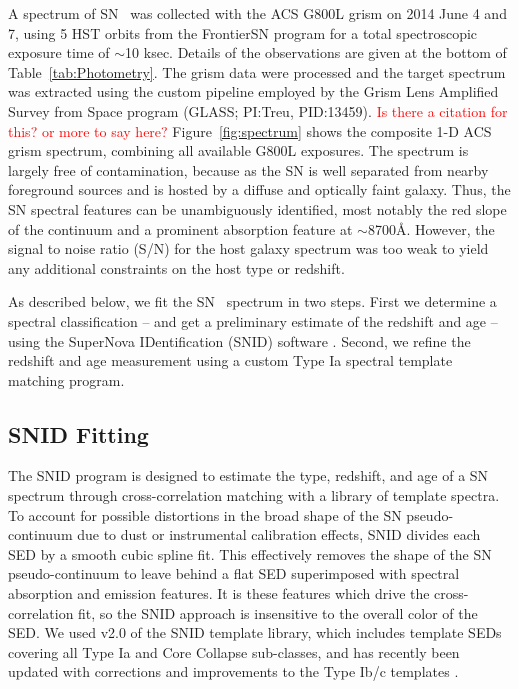 A spectrum of SN \tomas\ was collected with the ACS G800L grism on
2014 June 4 and 7, using 5 HST orbits from the FrontierSN program for
a total spectroscopic exposure time of $\sim$10 ksec.  Details of the
observations are given at the bottom of
Table~\ref{tab:Photometry}. The grism data were processed and the
target spectrum was extracted using the custom pipeline employed by
the Grism Lens Amplified Survey from Space program (GLASS; PI:Treu,
PID:13459). \textcolor{red}{Is there a citation for this? or more to
say here?}  Figure~\ref{fig:spectrum} shows the composite 1-D ACS
grism spectrum, combining all available G800L exposures.  The spectrum
is largely free of contamination, because as the SN is well separated
from nearby foreground sources and is hosted by a diffuse and
optically faint galaxy.  Thus, the SN spectral features can be
unambiguously identified, most notably the red slope of the continuum
and a prominent absorption feature at $\sim$8700\AA.  However, the
signal to noise ratio (S/N) for the host galaxy spectrum was too weak
to yield any additional constraints on the host type or redshift.  

As described below, we fit the SN \tomas\ spectrum in two steps.
First we determine a spectral classification -- and get a preliminary
estimate of the redshift and age -- using the SuperNova IDentification
(SNID) software \citep{Blondin:2007}.  Second, we refine the redshift
and age measurement using a custom Type Ia spectral template matching
program.

\subsection{SNID Fitting}
\label{sec:SNID}

The SNID program is designed to estimate the type, redshift, and age
of a SN spectrum through cross-correlation matching with a library of
template spectra.  To account for possible distortions in the broad
shape of the SN pseudo-continuum due to dust or instrumental
calibration effects, SNID divides each SED by a smooth cubic spline
fit. This effectively removes the shape of the SN pseudo-continuum to
leave behind a flat SED superimposed with spectral absorption and
emission features.  It is these features which drive the
cross-correlation fit, so the SNID approach is insensitive to the
overall color of the SED.  We used v2.0 of the SNID template library,
which includes template SEDs covering all Type Ia and Core Collapse
sub-classes, and has recently been updated with corrections and
improvements to the Type Ib/c templates \citep{Liu:2014}.


